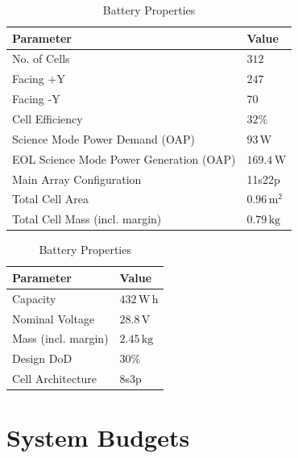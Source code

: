\documentclass[a4paper, 11pt, conference]{IEEEtran}
\begin{document}
\begin{table}[!htbp]
\centering
\begin{minipage}{0.46\textwidth}
\centering
\caption{Solar Array Properties}
\label{tab:solar_array}
\begin{tabular}{@{}ll@{}}
\toprule
\textbf{Parameter} & \textbf{Value} \\
\midrule
No. of Cells & $312$ \\
\quad Facing +Y & $247$ \\
\quad Facing -Y & $70$ \\
Cell Efficiency & $32\%$ \\
Science Mode Power Demand (OAP) & $93\,\mathrm{W}$ \\
EOL Science Mode Power Generation (OAP) & $169.4\,\mathrm{W}$ \\
Main Array Configuration & 11s22p \\
Total Cell Area & $0.96\,\mathrm{m}^2$ \\
Total Cell Mass (incl. margin) & $0.79\,\mathrm{kg}$ \\
\bottomrule
\end{tabular}
\end{minipage}
\hfill
\begin{minipage}{0.46\textwidth}
\centering
\caption{Battery Properties}
\label{tab:battery}
\begin{tabular}{@{}ll@{}}
\toprule
\textbf{Parameter} & \textbf{Value} \\
\midrule
Capacity & $432\,\mathrm{W\,h}$ \\
Nominal Voltage & $28.8\,\mathrm{V}$ \\
Mass (incl. margin) & $2.45\,\mathrm{kg}$ \\
Design DoD & $30\%$ \\
Cell Architecture & 8s3p \\
\bottomrule
\end{tabular}
\end{minipage}
\end{table}
\FloatBarrier
\section{System Budgets}
\end{document}
